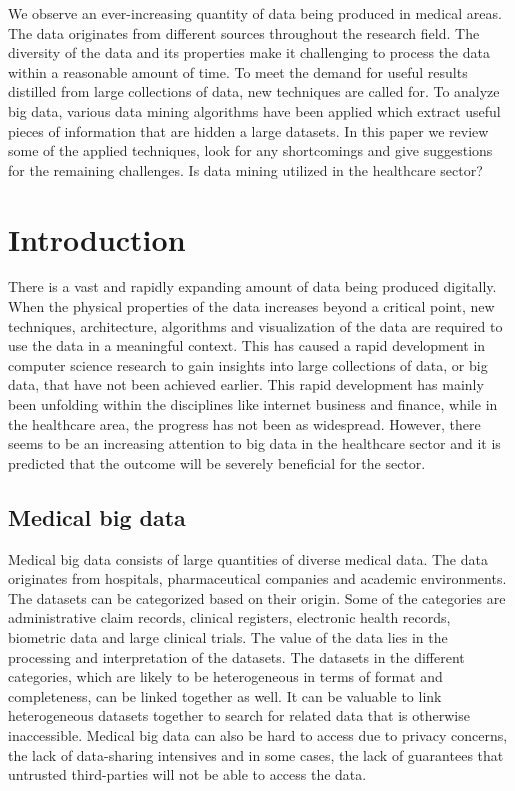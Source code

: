 We observe an ever-increasing quantity of data being produced in medical areas. The data originates from different sources throughout the research field. The diversity of the data and its properties make it challenging to process the data within a reasonable amount of time. To meet the demand for useful results distilled from large collections of data, new techniques are called for. To analyze big data, various data mining algorithms have been applied which extract useful pieces of information that are hidden a large datasets. In this paper we review some of the applied techniques, look for any shortcomings and give suggestions for the remaining challenges. Is data mining utilized in the healthcare sector? 

\section{Introduction}
There is a vast and rapidly expanding amount of data being produced digitally. When the physical properties of the data increases beyond a critical point, new techniques, architecture, algorithms and visualization of the data are required to use the data in a meaningful context. This has caused a rapid development in computer science research to gain insights into large collections of data, or big data, that have not been achieved earlier. This rapid development has mainly been unfolding within the disciplines like internet business and finance, while in the healthcare area, the progress has not been as widespread. However, there seems to be an increasing attention to big data in the healthcare sector and it is predicted that the outcome will be severely beneficial for the sector.\cite{gg}

\subsection{Medical big data}
Medical big data consists of large quantities of diverse medical data. The data originates from hospitals, pharmaceutical companies and academic environments. The datasets can be categorized based on their origin. Some of the categories are administrative claim records, clinical registers, electronic health records, biometric data and large clinical trials. The value of the data lies in the processing and interpretation of the datasets. The datasets in the different categories, which are likely to be heterogeneous in terms of format and completeness, can be linked together as well. It can be valuable to link heterogeneous datasets together to search for related data that is otherwise inaccessible.\cite{wp} Medical big data can also be hard to access due to privacy concerns, the lack of data-sharing intensives and in some cases, the lack of guarantees that untrusted third-parties will not be able to access the data. 

